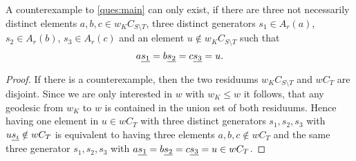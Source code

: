 \begin{lemm}
	A counterexample to \ref{ques:main} can only exist, if there are three not
	necessarily distinct elements $a,b,c \in w_K C_{S \setminus T}$, three
	distinct generators $s_1 \in A_r(a)$, $s_2 \in A_r(b)$, $s_3 \in A_r(c)$ and an
	element $u \notin w_K C_{S \setminus T}$ such that
	$$ a \underline{s_1} = b \underline{s_2} = c \underline{s_3} = u. $$

	\begin{proof}
		If there is a counterexample, then the two residuums $w_K C_{S \setminus T}$ and
		$w C_T$ are disjoint. Since we are only interested in $w$ with $w_K \leq w$
		it follows, that any geodesic from $w_K$ to $w$ is contained in the union set
		of both residuums. Hence having one element in $u \in w C_T$ with three distinct
		generators $s_1,s_2,s_3$ with $u \underline{s_i} \notin w C_T$ is equivalent to having
		three elements $a,b,c \notin w C_T$ and the same three generator $s_1,s_2,s_3$
		with $a \underline{s_1} = b \underline{s_2} = c \underline{s_3} = u \in w C_T$.
	\end{proof}
\end{lemm}